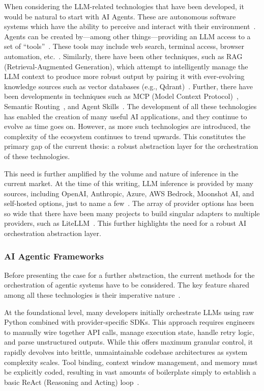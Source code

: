\documentclass[sigconf,nonacm]{acmart}
\begin{document}
When considering the LLM-related technologies that have been developed, it
would be natural to start with AI Agents. These are autonomous software
systems which have the ability to perceive and interact with their
environment~\cite{crewai2024}. Agents can be created by---among other
things---providing an LLM access to a set of ``tools''~\cite{schick2023toolformer}.
These tools may include web search, terminal access, browser automation,
etc.~\cite{schick2023toolformer}. Similarly, there have been other
techniques, such as RAG (Retrieval-Augmented Generation), which attempt to
intelligently manage the LLM context to produce more robust output by
pairing it with ever-evolving knowledge sources such as vector databases
(e.g., Qdrant)~\cite{lewis2020rag}. Further, there have been developments
in techniques such as MCP (Model Context Protocol)~\cite{anthropic2024mcp},
Semantic Routing~\cite{wang2025semanticrouter}, and Agent
Skills~\cite{manias2024skills}. The development of all these technologies has
enabled the creation of many useful AI applications, and they continue to
evolve as time goes on. However, as more such technologies are introduced,
the complexity of the ecosystem continues to trend upwards. This
constitutes the primary gap of the current thesis: a robust abstraction
layer for the orchestration of these technologies.

This need is further amplified by the volume and nature of inference in the
current market. At the time of this writing, LLM inference is provided by
many sources, including OpenAI, Anthropic, Azure, AWS Bedrock, Moonshot AI,
and self-hosted options, just to name a few~\cite{litellm2024}. The array of
provider options has been so wide that there have been many projects to
build singular adapters to multiple providers, such as
LiteLLM~\cite{litellm2024}. This further highlights the need for a robust
AI orchestration abstraction layer.

\subsubsection{AI Agentic Frameworks}
\label{sec:background:frameworks}

Before presenting the case for a further abstraction, the current methods
for the orchestration of agentic systems have to be considered. The key
feature shared among all these technologies is their imperative
nature~\cite{docker2025cagent}.

At the foundational level, many developers initially orchestrate LLMs using
raw Python combined with provider-specific SDKs. This approach requires
engineers to manually wire together API calls, manage execution state,
handle retry logic, and parse unstructured outputs. While this offers
maximum granular control, it rapidly devolves into brittle, unmaintainable
codebase architectures as system complexity scales. Tool binding, context
window management, and memory must be explicitly coded, resulting in vast
amounts of boilerplate simply to establish a basic ReAct (Reasoning and
Acting) loop~\cite{yao2023react}.
\end{document}
